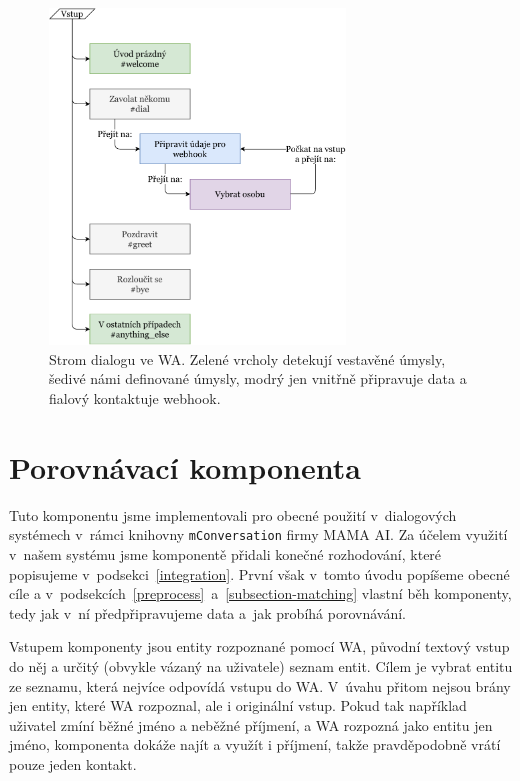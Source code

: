 \begin{figure}[h]
    \centering
    \includegraphics[width=0.7\textwidth]{../img/wa-tree.pdf}
    \caption{Strom dialogu ve WA. Zelené vrcholy detekují vestavěné úmysly,
        šedivé námi definované úmysly, modrý jen vnitřně připravuje data a fialový
        kontaktuje webhook.}\label{img-wa-tree}
\end{figure}

\section{Porovnávací komponenta}\label{matching}

Tuto komponentu jsme implementovali pro obecné použití v~dialogových systémech
v~rámci knihovny \texttt{mConversation} firmy MAMA AI. Za účelem využití v~našem
systému jsme komponentě přidali konečné rozhodování, které popisujeme v~podsekci~\ref{integration}.
První však v~tomto úvodu popíšeme obecné cíle a v~podsekcích~\ref{preprocess}~a~\ref{subsection-matching}
vlastní běh komponenty, tedy jak v~ní předpřipravujeme data a~jak probíhá porovnávání.

Vstupem komponenty jsou entity rozpoznané pomocí WA, původní textový vstup do něj
a určitý (obvykle vázaný na uživatele) seznam entit. Cílem je vybrat entitu ze seznamu,
která nejvíce odpovídá vstupu do WA. V~úvahu přitom nejsou brány jen entity, které
WA rozpoznal, ale i originální vstup. Pokud tak například uživatel zmíní běžné jméno a
neběžné příjmení, a WA rozpozná jako entitu jen jméno, komponenta dokáže najít a využít
i příjmení, takže pravděpodobně vrátí pouze jeden kontakt.

